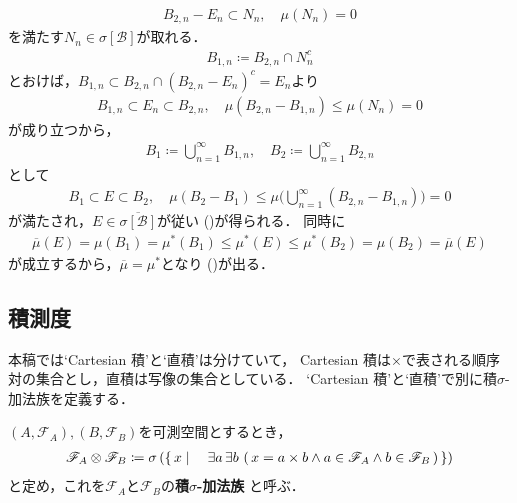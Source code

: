 \begin{prf}
\begin{description}
\begin{align}
						B_{2,n} - E_n \subset N_n, \quad \mu(N_n) = 0
					\end{align}
					を満たす$N_n \in \sigma[\mathcal{B}]$が取れる．
					\begin{align}
						B_{1,n} \coloneqq B_{2,n} \cap N_n^c
					\end{align}
					とおけば，$B_{1,n} \subset B_{2,n} \cap (B_{2,n} - E_n)^c = E_n$より
					\begin{align}
						B_{1,n} \subset E_n \subset B_{2,n},
						\quad \mu(B_{2,n} - B_{1,n}) \leq \mu(N_n) = 0
					\end{align}
					が成り立つから，
					\begin{align}
						B_1 \coloneqq \bigcup_{n=1}^\infty B_{1,n},
						\quad B_2 \coloneqq \bigcup_{n=1}^\infty B_{2,n}
					\end{align}
					として
					\begin{align}
						B_1 \subset E \subset B_2,
						\quad \mu(B_2 - B_1) \leq \mu\Biggl( \bigcup_{n=1}^\infty(B_{2,n} - B_{1,n}) \Biggr) = 0
					\end{align}
					が満たされ，$E \in \overline{\sigma[\mathcal{B}]}$が従い
					()が得られる．
					同時に
					\begin{align}
						\overline{\mu}(E) = \mu(B_1) = \mu^*(B_1)
						\leq \mu^*(E) \leq \mu^*(B_2) = \mu(B_2) = \overline{\mu}(E)
					\end{align}
					が成立するから，$\overline{\mu} = \mu^*$となり
					()が出る．
					\QED
			\end{description}
		\end{prf}
	
\subsection{積測度}
	本稿では`Cartesian 積'と`直積'は分けていて，
	Cartesian 積は$\times$で表される順序対の集合とし，直積は写像の集合としている．
	`Cartesian 積'と`直積'で別に積$\sigma$-加法族を定義する．
	\begin{screen}
		\begin{dfn}
			$(A,\mathscr{F}_A),(B,\mathscr{F}_B)$を可測空間とするとき，
			\begin{align}
				\mathscr{F}_A \otimes \mathscr{F}_B
				\coloneqq \sigma\left(\left\{\, x \mid \quad 
				\exists a\, \exists b\, 
				\left(\, x = a \times b \wedge a \in \mathscr{F}_A \wedge
				b \in \mathscr{F}_B\, \right)\, \right\} \right)
			\end{align}
			と定め，これを$\mathscr{F}_A$と$\mathscr{F}_B$の{\bf 積$\sigma$-加法族}
			と呼ぶ．
		\end{dfn}
	\end{screen}
	
